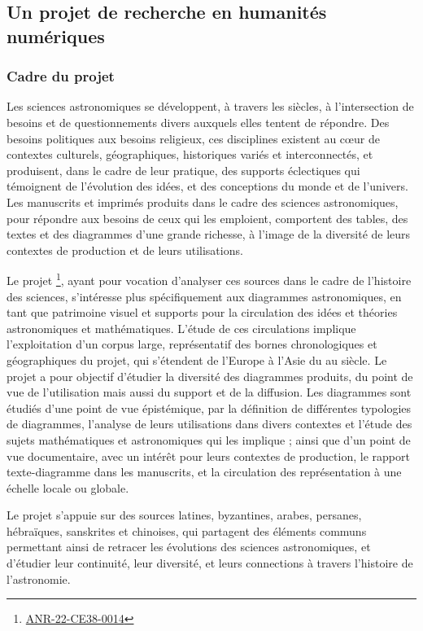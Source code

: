 
\subsection{Un projet de recherche en humanités numériques}
        \subsubsection{Cadre du projet}
Les sciences astronomiques se développent, à travers les siècles, à l’intersection de besoins et de questionnements divers auxquels elles tentent de répondre. Des besoins politiques aux besoins religieux, ces disciplines existent au cœur de contextes culturels, géographiques, historiques variés et interconnectés, et produisent, dans le cadre de leur pratique, des supports éclectiques qui témoignent de l'évolution des idées, et des conceptions du monde et de l'univers. Les manuscrits et imprimés produits dans le cadre des sciences astronomiques, pour répondre aux besoins de ceux qui les emploient, comportent des tables, des textes et des diagrammes d’une grande richesse, à l’image de la diversité de leurs contextes de production et de leurs utilisations. 

Le projet \eida\footnote{\href{https://anr.fr/Projet-ANR-22-CE38-0014}{ANR-22-CE38-0014}}, ayant pour vocation d'analyser ces sources dans le cadre de l'histoire des sciences, s’intéresse plus spécifiquement aux diagrammes astronomiques, en tant que patrimoine visuel et supports pour la circulation des idées et théories astronomiques et mathématiques. L’étude de ces circulations implique l’exploitation d’un corpus large, représentatif des bornes chronologiques et géographiques du projet, qui s’étendent de l’Europe à l’Asie du \viii au \xviii siècle. Le projet \eida a pour objectif d’étudier la diversité des diagrammes produits, du point de vue de l’utilisation mais aussi du support et de la diffusion. Les diagrammes sont étudiés d’une point de vue épistémique, par la définition de différentes typologies de diagrammes, l’analyse de leurs utilisations dans divers contextes et l’étude des sujets mathématiques et astronomiques qui les implique ; ainsi que d’un point de vue documentaire, avec un intérêt pour leurs contextes de production, le rapport texte-diagramme dans les manuscrits, et la circulation des représentation à une échelle locale ou globale. 

Le projet s’appuie sur des sources latines, byzantines, arabes, persanes, hébraïques, sanskrites et chinoises, qui partagent des éléments communs permettant ainsi de retracer les évolutions des sciences astronomiques, et d’étudier leur continuité, leur diversité, et leurs connections à travers l’histoire de l’astronomie.

